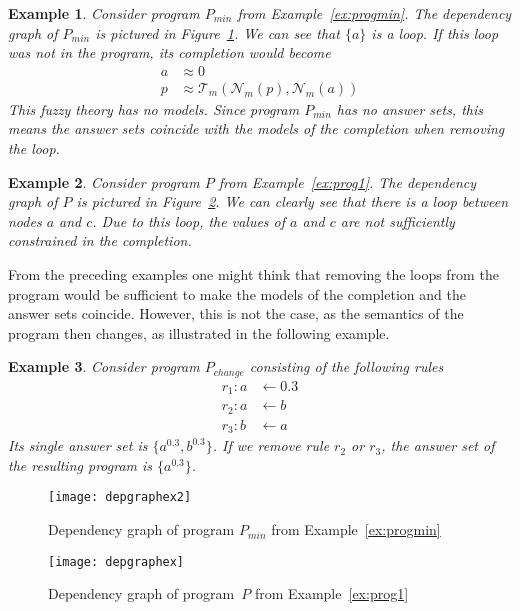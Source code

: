 \documentclass{tlp}
\newcommand{\fneg}[2]{\ensuremath{\mathcal{N}_{#1}(#2)}}
\newcommand{\feq}{\ensuremath{\approx}}
\newcommand{\pretnorm}{\mathcal{T}}
\newtheorem{example}{Example}
\begin{document}
\begin{example}
 Consider program $P_{min}$ from Example~\ref{ex:progmin}. The dependency graph of $P_{min}$ is pictured in Figure~\ref{fig:depgraph-prog2}. We can see that $\{a\}$ is a loop. If this loop was not in the program, its completion would become
 \begin{align*}
  a &\feq 0\\
  p &\feq \pretnorm_m(\fneg{m}{p},\fneg{m}{a})
 \end{align*}
 This fuzzy theory has no models. Since program $P_{min}$ has no answer sets, this means the answer sets coincide with the models of the completion when removing the loop.
\end{example}

\begin{example}
Consider program $P$ from Example~\ref{ex:prog1}. The dependency graph of $P$ is pictured in Figure~\ref{fig:depgraph-prog1}. We can clearly see that there is a loop between nodes $a$ and $c$. Due to this loop, the values of $a$ and $c$ are not sufficiently constrained in the completion.
\end{example}

From the preceding examples one might think that removing the loops from the program would be sufficient to make the models of the completion and the answer sets coincide. However, this is not the case, as the semantics of the program then changes, as illustrated in the following example.

\begin{example}\label{ex:progchange}
 Consider program $P_{change}$ consisting of the following rules
 \begin{align*}
  r_1: a &\gets 0.3\\
  r_2: a &\gets b\\
  r_3: b &\gets a
 \end{align*}
 Its single answer set is $\{ a^{0.3}, b^{0.3} \}$. If we remove rule $r_2$ or $r_3$, the answer set of the resulting program is $\{ a^{0.3} \}$.
\end{example}

\begin{figure}
 \centering
 \texttt{[image: depgraphex2]}
 \caption{Dependency graph of program $P_{min}$ from Example~\ref{ex:progmin}}
 \label{fig:depgraph-prog2}
\end{figure}

\begin{figure}
 \centering
 \texttt{[image: depgraphex]}
 \caption{Dependency graph of program~$P$ from Example~\ref{ex:prog1}}
 \label{fig:depgraph-prog1}
\end{figure}
\end{document}

